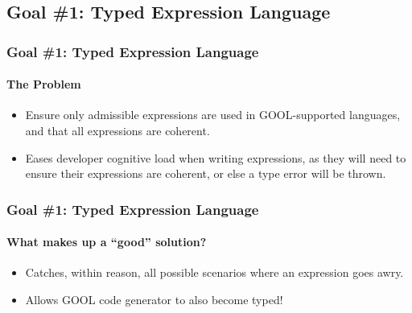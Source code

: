 \documentclass{beamer}
\begin{document}
\subsection{Goal \#1: Typed Expression Language}

\begin{frame}
    \frametitle{Goal \#1: Typed Expression Language}
    \framesubtitle{The Problem}
    
    \begin{itemize}
        \item<2-> Ensure only admissible expressions are used in GOOL-supported languages, and that all expressions are coherent.
        \item<3-> Eases developer cognitive load when writing expressions, as they will need to ensure their expressions are coherent, or else a type error will be thrown.
    \end{itemize}
\end{frame}

\begin{frame}
    \frametitle{Goal \#1: Typed Expression Language}
    \framesubtitle{What makes up a ``good'' solution?}
    
    \begin{itemize}
        \item<2-> Catches, within reason, all possible scenarios where an expression goes awry.
        \item<3-> Allows GOOL code generator to also become typed!
    \end{itemize}
\end{frame}
\end{document}
